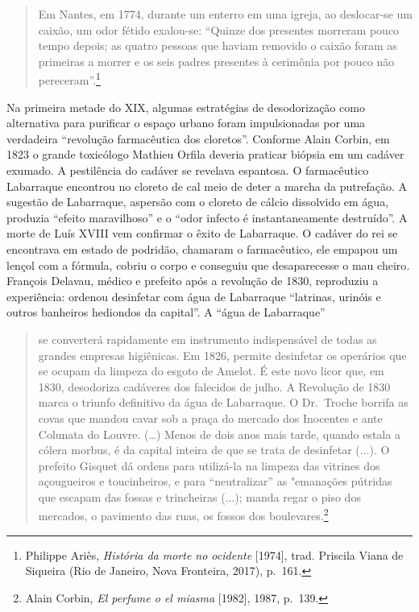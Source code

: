\begin{quote}
Em Nantes, em 1774, durante um enterro em uma igreja, ao deslocar-se um
caixão, um odor fétido exalou-se: ``Quinze dos presentes morreram pouco
tempo depois; as quatro pessoas que haviam removido o caixão foram as
primeiras a morrer e os seis padres presentes à cerimônia por pouco não
pereceram''.\footnote{Philippe Ariès, \emph{História da morte no
  ocidente} {[}1974{]}, trad. Priscila Viana de Siqueira (Rio de
  Janeiro, Nova Fronteira, 2017), p.~161.}
\end{quote}

Na primeira metade do XIX, algumas estratégias de desodorização como
alternativa para purificar o espaço urbano foram impulsionadas por uma
verdadeira ``revolução farmacêutica dos cloretos''. Conforme Alain
Corbin, em 1823 o grande toxicólogo Mathieu Orfila deveria praticar
biópsia em um cadáver exumado. A pestilência do cadáver se revelava
espantosa. O farmacêutico Labarraque encontrou no cloreto de cal meio de
deter a marcha da putrefação. A sugestão de Labarraque, aspersão com o
cloreto de cálcio dissolvido em água, produzia ``efeito maravilhoso'' e
o ``odor infecto é instantaneamente destruído''. A morte de Luís XVIII
vem confirmar o êxito de Labarraque. O cadáver do rei se encontrava em
estado de podridão, chamaram o farmacêutico, ele empapou um lençol com a
fórmula, cobriu o corpo e conseguiu que desaparecesse o mau
cheiro\emph{.} François Delavau, médico e prefeito após a revolução de
1830, reproduziu a experiência: ordenou desinfetar com água de
Labarraque ``latrinas, urinóis e outros banheiros hediondos da
capital''. A ``água de Labarraque''

\begin{quote}
se converterá rapidamente em instrumento indispensável de todas as
grandes empresas higiênicas. Em 1826, permite desinfetar os operários
que se ocupam da limpeza do esgoto de Amelot\emph{.} É este novo licor
que, em 1830, desodoriza cadáveres dos falecidos de julho. A Revolução
de 1830 marca o triunfo definitivo da água de Labarraque. O Dr.~Troche
borrifa as covas que mandou cavar sob a praça do mercado dos Inocentes e
ante Colunata do Louvre. (\ldots{}) Menos de dois anos mais tarde,
quando estala a cólera morbus, é da capital inteira de que se trata de
desinfetar (...). O prefeito Gisquet dá ordens para utilizá-la na
limpeza das vitrines dos açougueiros e toucinheiros, e para
``neutralizar'' as "emanações pútridas que escapam das fossas e
trincheiras (...); manda regar o piso dos mercados, o pavimento das
ruas, os fossos dos boulevares.\footnote{Alain Corbin, \emph{El perfume
  o el miasma} {[}1982{]}, 1987, p.~139.}
\end{quote}

